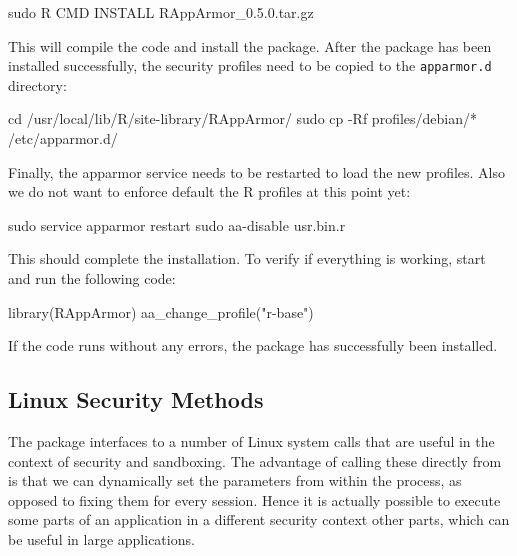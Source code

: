 \documentclass[article]{jss}
\begin{document}
\begin{CodeChunk}
\begin{CodeInput}
sudo R CMD INSTALL RAppArmor_0.5.0.tar.gz
\end{CodeInput}
\end{CodeChunk}

This will compile the  code and install the 
package. After the package has been installed successfully, the security
profiles need to be copied to the \texttt{apparmor.d} directory:

\begin{CodeChunk}
\begin{CodeInput}
cd /usr/local/lib/R/site-library/RAppArmor/
sudo cp -Rf profiles/debian/* /etc/apparmor.d/
\end{CodeInput}
\end{CodeChunk}

Finally, the apparmor service needs to be restarted to load the new profiles.
Also we do not want to enforce default the R profiles at this point yet:

\begin{CodeChunk}
\begin{CodeInput}
sudo service apparmor restart
sudo aa-disable usr.bin.r
\end{CodeInput}
\end{CodeChunk}

This should complete the installation. To verify if everything is working, start 
 and run the following code:

\begin{CodeChunk}
\begin{CodeInput}
library(RAppArmor)
aa_change_profile("r-base")
\end{CodeInput}
\end{CodeChunk}

If the code runs without any errors, the package has successfully been
installed.

\subsection{Linux Security Methods}

The  package interfaces to a number of Linux system calls that
are useful in the context of security and sandboxing. The advantage of calling
these directly from  is that we can dynamically set the parameters
from within the  process, as opposed to fixing them for every
 session. Hence it is actually possible to execute some parts of an
application in a different security context other parts, which can be useful in
large applications.
\end{document}
